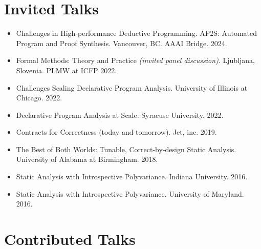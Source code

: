 \documentclass[line]{res}
\begin{document}
\begin{resume}


\section{\large Invited Talks} \vspace{0.2in}
\begin{itemize}
\item Challenges in High-performance Deductive Programming. AP2S: Automated Program and Proof Synthesis. Vancouver, BC. AAAI Bridge. 2024. 
\item Formal Methods: Theory and Practice \textit{(invited panel discussion)}. Ljubljana, Slovenia. PLMW at ICFP 2022.
\item Challenges Scaling Declarative Program Analysis. University of Illinois at Chicago. 2022.
\item Declarative Program Analysis at Scale. Syracuse University. 2022.
\item Contracts for Correctness (today and tomorrow). Jet, inc. 2019.
\item The Best of Both Worlds: Tunable, Correct-by-design Static Analysis. University of Alabama at Birmingham. 2018.
\item Static Analysis with Introspective Polyvariance. Indiana University. 2016.
\item Static Analysis with Introspective Polyvariance. University of Maryland. 2016.
\end{itemize}

\section{\large Contributed Talks} \vspace{0.2in}



\end{resume}
\end{document}
